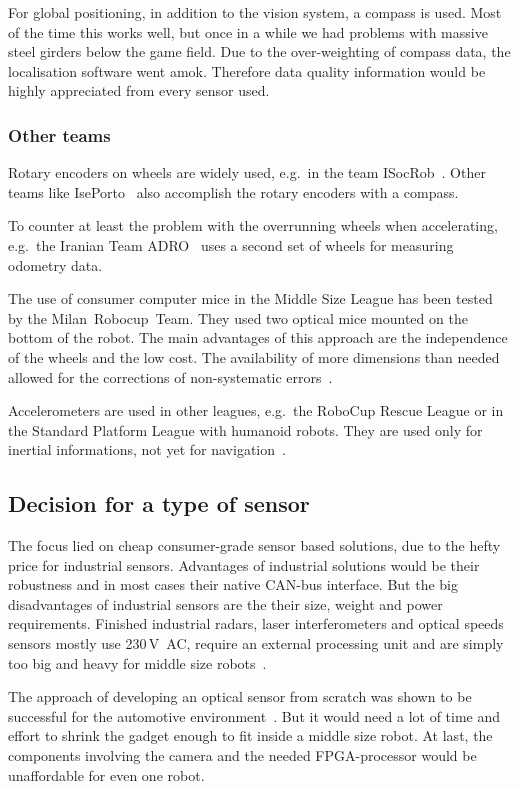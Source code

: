 \documentclass[12pt,a4paper]{article}
\newcommand{\MSL}{Middle Size League\xspace}
\begin{document}
For global positioning, in addition to the vision system, a compass is used.
Most of the time this works well, but once in a while we had problems with massive steel girders below the game field.
Due to the over-weighting of compass data, the localisation software went amok.
Therefore data quality information would be highly appreciated from every sensor used.

\subsubsection{Other teams}

Rotary encoders on wheels are widely used, e.g.\ in the team ISocRob~\cite{isocrob}.
Other teams like IsePorto~\cite{iseporto} also accomplish the rotary encoders with a compass.

To counter at least the problem with the overrunning wheels when accelerating, e.g.\ the Iranian Team ADRO~\cite{adro} uses a second set of wheels for measuring odometry data.

The use of consumer computer mice in the \MSL has been tested by the Milan~Robocup~Team.
They used two optical mice mounted on the bottom of the robot.
The main advantages of this approach are the independence of the wheels and the low cost.
The availability of more dimensions than needed allowed for the corrections of non-systematic errors~\cite{two_mice}.

Accelerometers are used in other leagues, e.g.\ the RoboCup Rescue League or in the Standard Platform League with humanoid robots.
They are used only for inertial informations, not yet for navigation~\cite{zadeat}.


\subsection{Decision for a type of sensor}
\label{decision}

The focus lied on cheap consumer-grade sensor based solutions, due to the hefty price for industrial sensors.
Advantages of industrial solutions would be their robustness and in most cases their native CAN-bus interface.
But the big disadvantages of industrial sensors are the their size, weight and power requirements.
Finished industrial radars, laser interferometers and optical speeds sensors mostly use 230\,V~AC, require an external processing unit and are simply too big and heavy for middle size robots~\cite{laser_vel, opt_vel, s_r_radar}.

The approach of developing an optical sensor from scratch was shown to be successful for the automotive environment~\cite{Hrach2006}.
But it would need a lot of time and effort to shrink the gadget enough to fit inside a middle size robot.
At last, the components involving the camera and the needed FPGA-processor would be unaffordable for even one robot.
\end{document}
